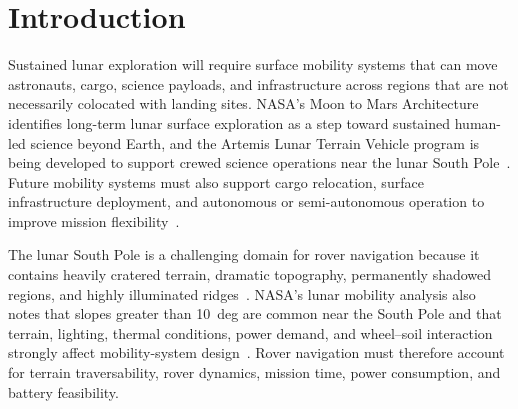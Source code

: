 
\begin{abstract}
Autonomous lunar rovers must navigate cratered terrain while respecting mobility, power, and battery limits. This project presents a two-stage navigation pipeline that combines terrain-aware global planning with time--energy trajectory generation. The terrain layer converts elevation data into traversability and risk fields and computes a feasible high-level route with A$^\ast$. The trajectory layer uses a reduced-order rover dynamics and power model to produce a dynamically consistent route along the planner path. On a cratered lunar-terrain benchmark, the pipeline generates a feasible \SI{42.0}{km} traverse in approximately \SI{42.3}{h} while maintaining battery feasibility under the implemented power model.
\end{abstract}

\section{Introduction}
Sustained lunar exploration will require surface mobility systems that can move astronauts, cargo, science payloads, and infrastructure across regions that are not necessarily colocated with landing sites. NASA's Moon to Mars Architecture identifies long-term lunar surface exploration as a step toward sustained human-led science beyond Earth, and the Artemis Lunar Terrain Vehicle program is being developed to support crewed science operations near the lunar South Pole~\cite{nasa_moon_to_mars_architecture,nasa_ltv}. Future mobility systems must also support cargo relocation, surface infrastructure deployment, and autonomous or semi-autonomous operation to improve mission flexibility~\cite{nasa_lunar_mobility_drivers_2024}.

The lunar South Pole is a challenging domain for rover navigation because it contains heavily cratered terrain, dramatic topography, permanently shadowed regions, and highly illuminated ridges~\cite{lpi_south_pole_atlas}. NASA's lunar mobility analysis also notes that slopes greater than \SI{10}{deg} are common near the South Pole and that terrain, lighting, thermal conditions, power demand, and wheel--soil interaction strongly affect mobility-system design~\cite{nasa_lunar_mobility_drivers_2024}. Rover navigation must therefore account for terrain traversability, rover dynamics, mission time, power consumption, and battery feasibility.

